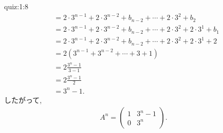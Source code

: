 \begin{answerof}{quiz:1:8}
\begin{align*}
    &=2\cdot 3^{n-1}+2\cdot 3^{n-2}+b_{n-2}+\cdots +2\cdot 3^{2}+b_2\\
    &=2\cdot 3^{n-1}+2\cdot 3^{n-2}+b_{n-2}+\cdots +2\cdot 3^{2}+2\cdot 3^1 +b_1\\
    &=2\cdot 3^{n-1}+2\cdot 3^{n-2}+b_{n-2}+\cdots +2\cdot 3^{2}+2\cdot 3^1 +2\\
    &=2(3^{n-1}+3^{n-2}+\cdots+3+1)\\
    &=2\frac{3^{n}-1}{3-1}\\
    &=2\frac{3^{n}-1}{2}\\
    &=3^{n}-1.
  \end{align*}
  したがって,
  \begin{align*}
    A^n=\begin{pmatrix}1&3^{n}-1\\0&3^n\end{pmatrix}.
  \end{align*}
\end{answerof}
